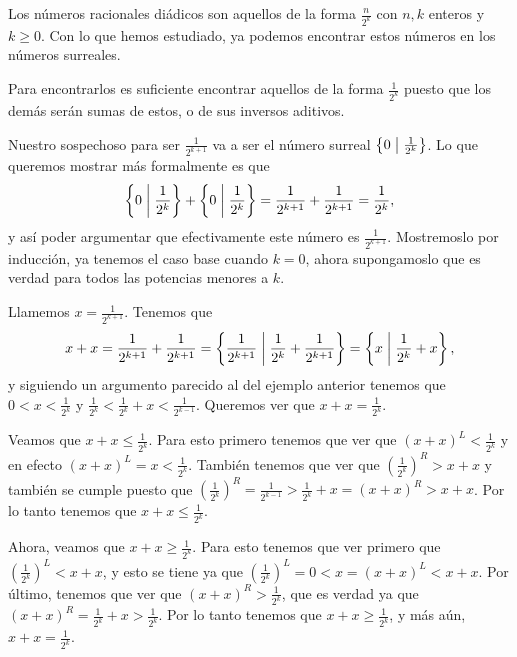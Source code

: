     \begin{example}
        \label{Ex_num_diadicos}
        Los n\'umeros racionales di\'adicos son aquellos de la forma $\frac{n}{2^k}$ con $n, k$ enteros y $k \ge 0$. Con lo que hemos estudiado, ya podemos encontrar estos n\'umeros en los n\'umeros surreales.

        Para encontrarlos es suficiente encontrar aquellos de la forma $\frac{1}{2^k}$ puesto que los dem\'as ser\'an sumas de estos, o de sus inversos aditivos.

        Nuestro sospechoso para ser $\frac{1}{2^{k+1}}$ va a ser el n\'umero surreal $\left\{0\;\middle|\; \frac{1}{2^k}\right\}$. Lo que queremos mostrar m\'as formalmente es que 
        \[
            \left\{0\;\middle|\; \frac{1}{2^{k}}\right\} + \left\{0\;\middle|\; \frac{1}{2^{k}}\right\} = \frac{1}{2^{k+1}} + \frac{1}{2^{k+1}} = \frac{1}{2^k},
        \]
        y as\'i poder argumentar que efectivamente este n\'umero es $\frac{1}{2^{k+1}}$. Mostremoslo por inducci\'on, ya tenemos el caso base cuando $k=0$, ahora supongamoslo que es verdad para todos las potencias menores a $k$.

        Llamemos $x = \frac{1}{2^{k+1}}$. Tenemos que
        \[
            x + x = \frac{1}{2^{k+1}} + \frac{1}{2^{k+1}} = \left\{\frac{1}{2^{k+1}}\;\middle|\; \frac{1}{2^{k}} +\frac{1}{2^{k+1}}\right\} = \left\{x\;\middle|\; \frac{1}{2^k} + x\right\},
        \]
        y siguiendo un argumento parecido al del ejemplo anterior tenemos que $0 < x < \frac{1}{2^k}$ y $\frac{1}{2^k} < \frac{1}{2^k} + x < \frac{1}{2^{k-1}}$. Queremos ver que $x+x = \frac{1}{2^{k}}$.

        Veamos que $x+x\le \frac{1}{2^k}$. Para esto primero tenemos que ver que $(x+x)^L < \frac{1}{2^k}$ y en efecto $(x+x)^L = x < \frac{1}{2^k}$. Tambi\'en tenemos que ver que $(\frac{1}{2^k})^R > x+x$ y tambi\'en se cumple puesto que $(\frac{1}{2^k})^R = \frac{1}{2^{k-1}} > \frac{1}{2^k} + x = (x+x)^R > x+x$. Por lo tanto tenemos que $x+x\le \frac{1}{2^k}$.

        Ahora, veamos que $x+x\ge \frac{1}{2^k}$. Para esto tenemos que ver primero que $(\frac{1}{2^k})^L < x+x$, y esto se tiene ya que $(\frac{1}{2^k})^L = 0 < x = (x+x)^L < x+x$. Por \'ultimo, tenemos que ver que $(x+x)^R > \frac{1}{2^k}$, que es verdad ya que $(x+x)^R = \frac{1}{2^k} + x > \frac{1}{2^k}$. Por lo tanto tenemos que $x+x\ge \frac{1}{2^k}$, y m\'as a\'un, $x+x = \frac{1}{2^k}$.

    \end{example}